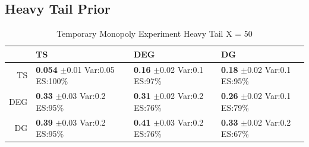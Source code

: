 \documentclass[11pt,letterpaper]{article}
\begin{document}
\subsection*{Heavy Tail Prior}
\begin{table}[H]
\centering
\caption{Temporary Monopoly Experiment Heavy Tail X = 50} 
\begin{tabular}{rlll}
  \hline
 & TS & DEG &  DG \\ 
  \hline
TS & \makecell{\textbf{0.054} $\pm$0.01\\Var:0.05\\ES:100\%} & \makecell{\textbf{0.16} $\pm$0.02\\Var:0.1\\ES:97\%} & \makecell{\textbf{0.18} $\pm$0.02\\Var:0.1\\ES:95\%} \\ 
  DEG & \makecell{\textbf{0.33} $\pm$0.03\\Var:0.2\\ES:95\%} & \makecell{\textbf{0.31} $\pm$0.02\\Var:0.2\\ES:76\%} & \makecell{\textbf{0.26} $\pm$0.02\\Var:0.1\\ES:79\%} \\ 
   DG & \makecell{\textbf{0.39} $\pm$0.03\\Var:0.2\\ES:95\%} & \makecell{\textbf{0.41} $\pm$0.03\\Var:0.2\\ES:76\%} & \makecell{\textbf{0.33} $\pm$0.02\\Var:0.2\\ES:67\%} \\ 
   \hline
\end{tabular}
\end{table}
\end{document}
